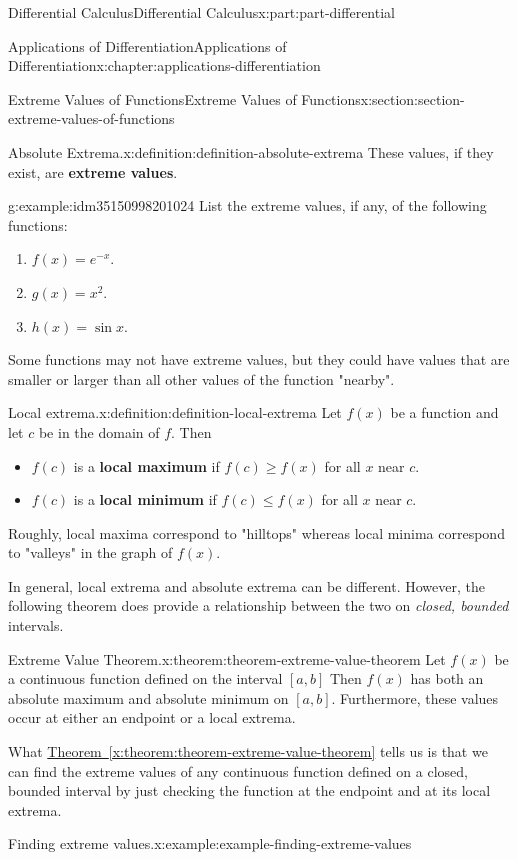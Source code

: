 \documentclass[twoside,10pt,]{tufte-book}
\newcommand{\xreffont}{\relax}
\newcommand{\terminology}[1]{\textbf{#1}}
\numberwithin{equation}{part}
\begin{document}
\begin{partptx}{Differential Calculus}{}{Differential Calculus}{}{}{x:part:part-differential}
\begin{chapterptx}{Applications of Differentiation}{}{Applications of Differentiation}{}{}{x:chapter:applications-differentiation}
\begin{sectionptx}{Extreme Values of Functions}{}{Extreme Values of Functions}{}{}{x:section:section-extreme-values-of-functions}
\begin{definition}{Absolute Extrema.}{x:definition:definition-absolute-extrema}
These values, if they exist, are \terminology{extreme values}.%
\end{definition}
\begin{example}{}{g:example:idm35150998201024}%
List the extreme values, if any, of the following functions:%
\begin{enumerate}
\item{}\(f(x) = e^{-x}\).%
\item{}\(g(x) = x^{2}\).%
\item{}\(h(x) = \sin x\).%
\end{enumerate}
%
\end{example}
Some functions may not have extreme values, but they could have values that are smaller or larger than all other values of the function "nearby".%
\begin{definition}{Local extrema.}{x:definition:definition-local-extrema}%
%
Let \(f(x)\) be a function and let \(c\) be in the domain of \(f\). Then%
\begin{itemize}[label=\textbullet]
\item{}\(f(c)\) is a \terminology{local maximum} if \(f(c)\geq f(x)\) for all \(x\) near \(c\).%
\item{}\(f(c)\) is a \terminology{local minimum} if \(f(c)\leq f(x)\) for all \(x\) near \(c\).%
\end{itemize}
Roughly, local maxima correspond to "hilltops" whereas local minima correspond to "valleys" in the graph of \(f(x)\).%
\end{definition}
In general, local extrema and absolute extrema can be different. However, the following theorem does provide a relationship between the two on \emph{closed, bounded} intervals.%
\begin{theorem}{Extreme Value Theorem.}{}{x:theorem:theorem-extreme-value-theorem}%
%
Let \(f(x)\) be a continuous function defined on the interval \([a,b]\) Then \(f(x)\) has both an absolute maximum and absolute minimum on \([a,b]\). Furthermore, these values occur at either an endpoint or a local extrema.%
\end{theorem}
What \hyperref[x:theorem:theorem-extreme-value-theorem]{Theorem~{\xreffont\ref{x:theorem:theorem-extreme-value-theorem}}} tells us is that we can find the extreme values of any continuous function defined on a closed, bounded interval by just checking the function at the endpoint and at its local extrema.%
\begin{example}{Finding extreme values.}{x:example:example-finding-extreme-values}%

\end{example}
\end{sectionptx}
\end{chapterptx}
\end{partptx}
\end{document}
